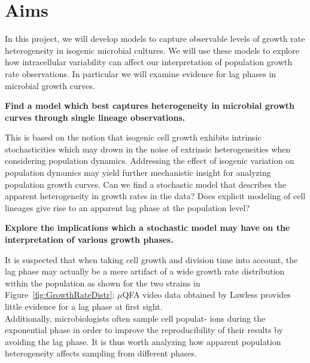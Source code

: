 \documentclass{bioinfo}
\begin{document}
\section{Aims}

In this project, we will develop models to capture observable levels of  growth rate heterogeneity in isogenic microbial cultures.  We will use these models to explore how intracellular variability can affect our interpretation of population growth rate observations.  In particular we will examine evidence for lag phases in microbial growth curves.

\textbf{Find a model which best captures heterogeneity in microbial growth curves through single lineage observations.}
\begin{addmargin}[1.5em]{1.5em}
This is based on the notion that isogenic cell growth exhibits intrinsic stochasticities which may drown in the noise of extrinsic heterogeneities when considering population dynamics. Addressing the effect of isogenic variation on population dynamics may yield further mechanistic insight for analyzing population growth curves. Can we find a stochastic model that describes the apparent heterogeneity in growth rates in the data? Does explicit modeling of cell lineages give rise to an apparent lag phase at the population level? 
\end{addmargin}

\textbf{Explore the implications which a stochastic model may have on the interpretation of various growth phases.} 
\begin{addmargin}[1.5em]{1.5em}
It is suspected that when taking cell growth and division time into account, the lag phase may actually be a mere artifact of a wide growth rate distribution within the population as shown for the two strains in Figure~\ref{fig:GrowthRateDistr}; $\mu$QFA video data obtained by Lawless provides little evidence for a lag phase at first sight. \\ Additionally, microbiologists often sample cell populat- ions during the exponential phase in order to improve the reproducibility of their results by avoiding the lag phase. It is thus worth analyzing how apparent population heterogeneity affects sampling from different phases.
\end{addmargin}
\end{document}
